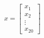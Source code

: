 \documentclass[preview]{standalone}
\begin{document}
\begin{align*}
x = \begin{bmatrix} x_1 \\ x_2 \\ \vdots \\ x_{20} \end{bmatrix}
\end{align*}
\end{document}
